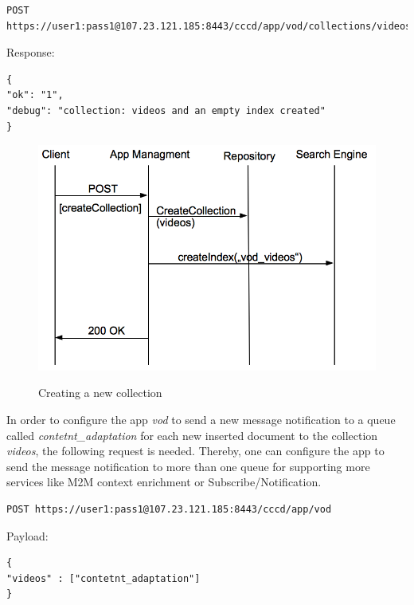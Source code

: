 \begin{code}
\begin{verbatim}
POST https://user1:pass1@107.23.121.185:8443/cccd/app/vod/collections/videos
\end{verbatim}
Response:
\begin{verbatim}
{
"ok": "1",
"debug": "collection: videos and an empty index created"
}
\end{verbatim}
\end{code}

\begin{figure}[htb]
  \centering
  \includegraphics[scale=0.6]{flows/newCollectionFlow.png}\\
  \caption{Creating a new collection}
  \label{fig:newCollection}
\end{figure}

In order to configure the app \textit{vod} to send a new message notification to a queue called \textit{contetnt\_adaptation} for each new inserted document to the collection \textit{videos}, the following request is needed. Thereby, one can configure the app to send the message notification to more than one queue for supporting more services like M2M context enrichment or Subscribe/Notification.

\begin{code}
\begin{verbatim}
POST https://user1:pass1@107.23.121.185:8443/cccd/app/vod
\end{verbatim}
Payload:
\begin{verbatim}
{
"videos" : ["contetnt_adaptation"]
}
\end{verbatim}
\end{code}

